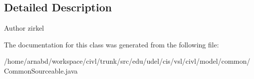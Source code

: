 \subsection{Detailed Description}
\begin{DoxyAuthor}{Author}
zirkel 
\end{DoxyAuthor}


The documentation for this class was generated from the following file\+:\begin{DoxyCompactItemize}
\item 
/home/arnabd/workspace/civl/trunk/src/edu/udel/cis/vsl/civl/model/common/Common\+Sourceable.\+java\end{DoxyCompactItemize}
